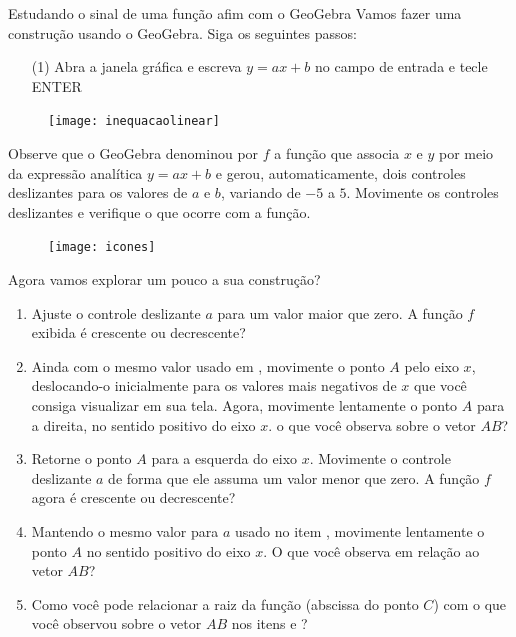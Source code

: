 \begin{task} {Estudando o sinal de uma função afim com o GeoGebra}
Vamos fazer uma construção usando o GeoGebra. Siga os seguintes passos:
\begin{enumerate}
\item[(1)] 
Abra a janela gráfica e escreva $y=ax+b$ no campo de entrada e tecle ENTER
\end{enumerate}

\begin{figure}[H]
\centering
\noindent\texttt{[image: inequacaolinear]}
\end{figure}

Observe que o GeoGebra denominou por $f$ a função que associa $x$ e $y$ por meio da expressão analítica $y=ax+b$ e gerou, automaticamente, dois controles deslizantes para os valores de $a$ e $b$, variando de $-5$ a $5$. Movimente os controles deslizantes e verifique o que ocorre com a função.


\begin{figure}[H]
\centering
\noindent\texttt{[image: icones]}
\end{figure}

Agora vamos explorar um pouco a sua construção?

\begin{enumerate}
\item{} 
Ajuste o controle deslizante $a$ para um valor maior que zero. A função $f$ exibida é crescente ou decrescente?

\item{}
 Ainda com o mesmo valor usado em , movimente o ponto $A$ pelo eixo $x$, deslocando-o inicialmente para os valores mais negativos de $x$ que você consiga visualizar em sua tela. Agora, movimente lentamente o ponto $A$ para a direita, no sentido positivo do eixo $x$. o que você observa sobre o vetor $AB$?
 
\item{} 
Retorne o ponto $A$ para a esquerda do eixo $x$. Movimente o controle deslizante $a$ de forma que ele assuma um valor menor que zero. A função $f$ agora é crescente ou decrescente?

\item{}
Mantendo o mesmo valor para $a$ usado no item , movimente lentamente o ponto $A$ no sentido positivo do eixo $x$. O que você observa em relação ao vetor $AB$?

\item{}
Como você pode relacionar a raiz da função (abscissa do ponto $C$) com o que você observou sobre o vetor $AB$ nos itens  e ?

\end{enumerate}
\end{task}

